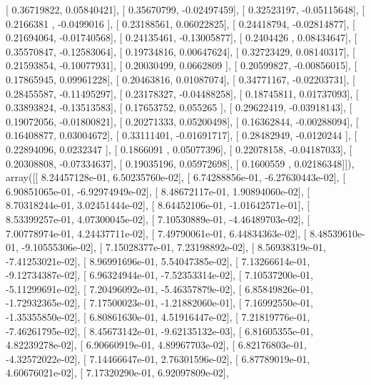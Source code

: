 \documentclass{article}
\begin{document}
       [ 0.36719822,  0.05840421],
       [ 0.35670799, -0.02497459],
       [ 0.32523197, -0.05115648],
       [ 0.2166381 , -0.0499016 ],
       [ 0.23188561,  0.06022825],
       [ 0.24418794, -0.02814877],
       [ 0.21694064, -0.01740568],
       [ 0.24135461, -0.13005877],
       [ 0.2404426 ,  0.08434647],
       [ 0.35570847, -0.12583064],
       [ 0.19734816,  0.00647624],
       [ 0.32723429,  0.08140317],
       [ 0.21593854, -0.10077931],
       [ 0.20030499,  0.0662809 ],
       [ 0.20599827, -0.00856015],
       [ 0.17865945,  0.09961228],
       [ 0.20463816,  0.01087074],
       [ 0.34771167, -0.02203731],
       [ 0.28455587, -0.11495297],
       [ 0.23178327, -0.04488258],
       [ 0.18745811,  0.01737093],
       [ 0.33893824, -0.13513583],
       [ 0.17653752,  0.055265  ],
       [ 0.29622419, -0.03918143],
       [ 0.19072056, -0.01800821],
       [ 0.20271333,  0.05200498],
       [ 0.16362844, -0.00288094],
       [ 0.16408877,  0.03004672],
       [ 0.33111401, -0.01691717],
       [ 0.28482949, -0.0120244 ],
       [ 0.22894096,  0.0232347 ],
       [ 0.1866091 ,  0.05077396],
       [ 0.22078158, -0.04187033],
       [ 0.20308808, -0.07334637],
       [ 0.19035196,  0.05972698],
       [ 0.1600559 ,  0.02186348]]), array([[  8.24457128e-01,   6.50235760e-02],
       [  6.74288856e-01,  -6.27630443e-02],
       [  6.90851065e-01,  -6.92974949e-02],
       [  8.48672117e-01,   1.90894060e-02],
       [  8.70318244e-01,   3.02451444e-02],
       [  8.64452106e-01,  -1.01642571e-01],
       [  8.53399257e-01,   4.07300045e-02],
       [  7.10530889e-01,  -4.46489703e-02],
       [  7.00778974e-01,   4.24437711e-02],
       [  7.49790061e-01,   6.44834363e-02],
       [  8.48539610e-01,  -9.10555306e-02],
       [  7.15028377e-01,   7.23198892e-02],
       [  8.56938319e-01,  -7.41253021e-02],
       [  8.96991696e-01,   5.54047385e-02],
       [  7.13266614e-01,  -9.12734387e-02],
       [  6.96324944e-01,  -7.52353314e-02],
       [  7.10537200e-01,  -5.11299691e-02],
       [  7.20496092e-01,  -5.46357879e-02],
       [  6.85849826e-01,  -1.72932365e-02],
       [  7.17500023e-01,  -1.21882060e-01],
       [  7.16992550e-01,  -1.35355850e-02],
       [  6.80861630e-01,   4.51916447e-02],
       [  7.21819776e-01,  -7.46261795e-02],
       [  8.45673142e-01,  -9.62135132e-03],
       [  6.81605355e-01,   4.82239278e-02],
       [  6.90660919e-01,   4.89967703e-02],
       [  6.82176803e-01,  -4.32572022e-02],
       [  7.14466647e-01,   2.76301596e-02],
       [  6.87789019e-01,   4.60676021e-02],
       [  7.17320290e-01,   6.92097809e-02],
\end{document}
